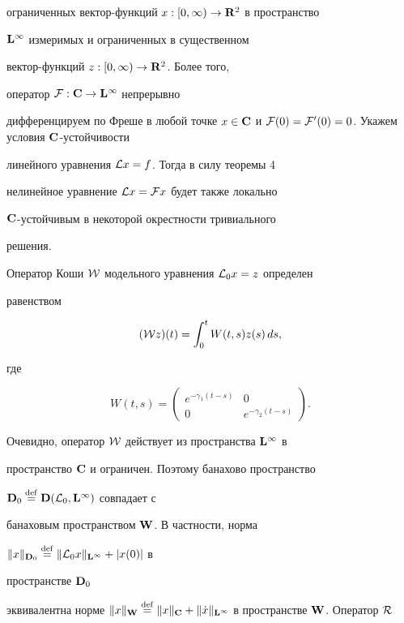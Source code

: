 \begin{exam}
ограниченных вектор-функций $x:[0,\infty)\to\bold {R}^2$ в пространство


$\bold {L}^{\infty}$ измеримых и ограниченных в существенном


вектор-функций $z:[0,\infty)\to\bold {R}^2$. Более того,


оператор ${\cal F}:\bold {C}\to\bold {L}^{\infty}$ непрерывно


дифференцируем по Фреше в любой точке $x\in\spc{C}$ и ${\cal


F}(0)={\cal F}'(0)=0$. Укажем условия $\spc{C}$-устойчивости


линейного уравнения ${\cal L}x=f$. Тогда в силу теоремы 4


нелинейное уравнение ${\cal L}x = {\cal F}x$ будет также локально


$\bold {C}$-устойчивым в некоторой окрестности тривиального


решения.





Оператор Коши $\cal W$ модельного уравнения ${\cal L}_0x=z$ определен


равенством


$$


({\cal W}z)(t)=\int_0^tW(t,s)z(s)\,ds,


$$


где


$$


W(t,s)=\begin{pmatrix}


e^{-\gamma_1(t-s)} & 0 \\ 0 & e^{-\gamma_2(t-s)}\end{pmatrix}.


$$


Очевидно, оператор $\cal W$ действует из пространства $\bold {L}^{\infty}$ в


пространство $\bold {C}$ и ограничен. Поэтому банахово пространство


$\bold {D}_0\overset{\mathrm{def}}{=}{}\bold {D}({\cal L}_0,\bold {L}^{\infty})$ совпадает с


банаховым пространством $\bold {W}$. В частности, норма


$\|x\|_{\bold{D}_0}\overset{\mathrm{def}}{=}{}\|{\cal L}_0x\|_{\bold{L}^{\infty}}+|x(0)|$ в


пространстве $\bold {D}_0$


эквивалентна норме $\|x\|_{\bold W}\eqdef\|x\|_{\bold C}+\|\Dot


x\|_{\bold{L}^{\infty}}$ в пространстве $\spc{W}$. Оператор ${\cal R}$



\end{exam}
